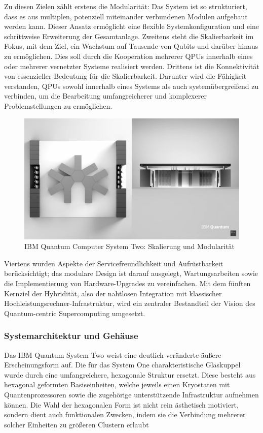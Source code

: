 Zu diesen Zielen zählt erstens die Modularität: Das System ist so strukturiert, dass es aus multiplen, potenziell miteinander verbundenen Modulen aufgebaut werden kann. Dieser Ansatz ermöglicht eine flexible Systemkonfiguration und eine schrittweise Erweiterung der Gesamtanlage. 
Zweitens steht die Skalierbarkeit im Fokus, mit dem Ziel, ein Wachstum auf Tausende von Qubits und darüber hinaus zu ermöglichen. Dies soll durch die Kooperation mehrerer QPUs innerhalb eines oder mehrerer vernetzter Systeme realisiert werden. 
Drittens ist die Konnektivität von essenzieller Bedeutung für die Skalierbarkeit. Darunter wird die Fähigkeit verstanden, QPUs sowohl innerhalb eines Systems als auch systemübergreifend zu verbinden, um die Bearbeitung umfangreicherer und komplexerer Problemstellungen zu ermöglichen.

\begin{figure}[H]
    \centering
    \includegraphics[width=\textwidth]{images/quanten-hardware/IBM_Quantum_System_two_modular.jpg}
    \caption{IBM Quantum Computer System Two: Skalierung und Modularität}
    \label{fig:ibmquantumsystemtwomodular}
\end{figure}

Viertens wurden Aspekte der Servicefreundlichkeit und Aufrüstbarkeit berücksichtigt; das modulare Design ist darauf ausgelegt, Wartungsarbeiten sowie die Implementierung von Hardware-Upgrades zu vereinfachen. Mit dem fünften Kernziel der Hybridität, also der nahtlosen Integration mit klassischer Hochleistungsrechner-Infrastruktur, wird ein zentraler Bestandteil der Vision des Quantum-centric Supercomputing umgesetzt.

\subsubsection{Systemarchitektur und Gehäuse}
Das IBM Quantum System Two weist eine deutlich veränderte äußere Erscheinungsform auf. Die für das System One charakteristische Glaskuppel wurde durch eine umfangreichere, hexagonale Struktur ersetzt. Diese besteht aus hexagonal geformten Basiseinheiten, welche jeweils einen Kryostaten mit Quantenprozessoren sowie die zugehörige unterstützende Infrastruktur aufnehmen können. Die Wahl der hexagonalen Form ist nicht rein ästhetisch motiviert, sondern dient auch funktionalen Zwecken, indem sie die Verbindung mehrerer solcher Einheiten zu größeren Clustern erlaubt 

